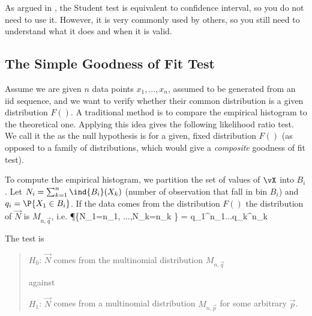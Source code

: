 As argued in , the Student test is equivalent to
confidence interval, so you do not need to use it. However, it
is very commonly used by others, so you still need to
understand what it does and when it is valid.


\subsection{The Simple Goodness of Fit Test}
 Assume we are given $n$ data points $x_1,
...,x_n$, assumed to be generated from an iid sequence, and we want
to verify whether their common distribution is a given distribution
$F()$. A traditional method is to compare the empirical histogram to
the theoretical one. Applying this idea gives the following
likelihood ratio test. We call it the  as the null hypothesis is for a given, fixed distribution
$F()$ (as opposed to a family of distributions, which would give a
\emph{composite} goodness of fit test).

To compute the empirical histogram, we partition the set of
values of ${\vX}$ into  $B_i$. Let $N_i=\sum_{k=1}^n
\ind{B_i}(X_k)$ (number of observation that fall in bin $B_i$)
and $q_i=\P\{X_1\in B_i\}$. If the data comes from the
distribution $F()$ the distribution of $\vec{N}$ is 
$M_{n,\vec{q}}$, i.e.
\be
 \P\left\{N_1=n_1, ...,N_k=n_k  \right\} =
 q_1^{n_1}...q_k^{n_k}
\ee

The test is
\begin{quote}
$H_0$: $\vec{N}$ comes from the multinomial distribution $M_{n,\vec{q}}$

against

$H_1$: $\vec{N}$ comes from a multinomial distribution $M_{n,\vec{p}}$
for some arbitrary $\vec{p}$. \end{quote}

